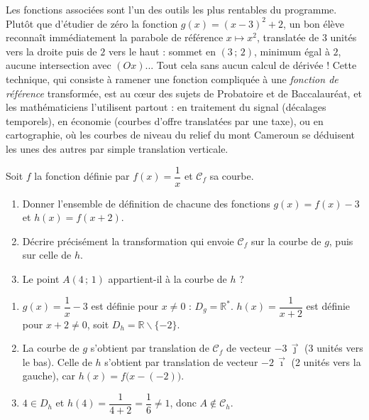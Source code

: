 \documentclass[11pt]{article}
\def\setminus{\mathbin{\backslash}}\let\smallsetminus\setminus
\begin{document}
\begin{savaistu}
Les fonctions associées sont l'un des outils les plus rentables du programme. Plutôt que d'étudier de zéro la fonction $g(x) = (x-3)^2 + 2$, un bon élève reconnaît immédiatement la parabole de référence $x \mapsto x^2$, translatée de $3$ unités vers la droite puis de $2$ vers le haut : sommet en $(3\,;\,2)$, minimum égal à $2$, aucune intersection avec $(Ox)$... Tout cela sans aucun calcul de dérivée ! Cette technique, qui consiste à ramener une fonction compliquée à une \emph{fonction de référence} transformée, est au cœur des sujets de Probatoire et de Baccalauréat, et les mathématiciens l'utilisent partout : en traitement du signal (décalages temporels), en économie (courbes d'offre translatées par une taxe), ou en cartographie, où les courbes de niveau du relief du mont Cameroun se déduisent les unes des autres par simple translation verticale.
\end{savaistu}

\begin{exercice}
Soit $f$ la fonction définie par $f(x) = \dfrac{1}{x}$ et $\mathcal{C}_f$ sa courbe.
\begin{enumerate}
\item Donner l'ensemble de définition de chacune des fonctions $g(x) = f(x) - 3$ et $h(x) = f(x+2)$.
\item Décrire précisément la transformation qui envoie $\mathcal{C}_f$ sur la courbe de $g$, puis sur celle de $h$.
\item Le point $A(4\,;\,1)$ appartient-il à la courbe de $h$ ?
\end{enumerate}
\end{exercice}

\begin{corrige}[Exercice 1]
\begin{enumerate}
\item $g(x) = \dfrac{1}{x} - 3$ est définie pour $x \neq 0$ : $D_g = \mathbb{R}^*$. $h(x) = \dfrac{1}{x+2}$ est définie pour $x + 2 \neq 0$, soit $D_h = \mathbb{R}\setminus\{-2\}$.
\item La courbe de $g$ s'obtient par translation de $\mathcal{C}_f$ de vecteur $-3\,\vec{\jmath}$ (3 unités vers le bas). Celle de $h$ s'obtient par translation de vecteur $-2\,\vec{\imath}$ (2 unités vers la gauche), car $h(x) = f\big(x-(-2)\big)$.
\item $4 \in D_h$ et $h(4) = \dfrac{1}{4+2} = \dfrac{1}{6} \neq 1$, donc $A \notin \mathcal{C}_h$.
\end{enumerate}
\end{corrige}
\end{document}
